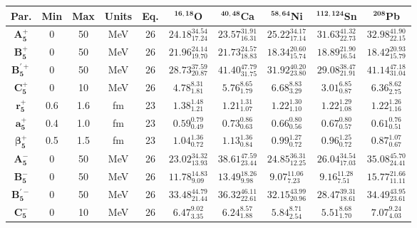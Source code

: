 \bgroup
\def\arraystretch{1.5}%
\begin{tabular}{ c c c c c c c c c c} 
\textbf{Par.} & \textbf{Min} & \textbf{Max} &                \textbf{Units} & \textbf{Eq.}& \textbf{$\mathbf{^{16,18}}$O}& \textbf{$\mathbf{^{40,48}}$Ca}& \textbf{$\mathbf{^{58,64}}$Ni}& \textbf{$\mathbf{^{112,124}}$Sn}& \textbf{$\mathbf{^{208}}$Pb}\\
 \hline 
$\mathbf{A_{5}^{+}}$ & 0 & 50 & MeV & 26 & $24.18^{34.54}_{17.24}$ & $23.57^{31.91}_{16.31}$ & $25.22^{34.17}_{17.14}$ & $31.63^{41.32}_{22.73}$ & $32.98^{41.90}_{22.15}$\\ 
$\mathbf{B_{5}^{+}}$ & 0 & 50 & MeV & 26 & $21.96^{24.14}_{19.70}$ & $21.73^{24.57}_{18.83}$ & $18.34^{20.60}_{15.74}$ & $18.89^{21.90}_{16.54}$ & $18.42^{20.93}_{15.79}$\\ 
$\mathbf{B_{5}^{'+}}$ & 0 & 50 & MeV & 26 & $28.73^{37.59}_{20.87}$ & $41.40^{47.79}_{31.75}$ & $31.92^{40.20}_{23.80}$ & $29.08^{38.47}_{21.91}$ & $41.14^{47.18}_{31.04}$\\ 
$\mathbf{C_{5}^{+}}$ & 0 & 10 & MeV & 26 & $4.78^{8.31}_{1.81}$ & $5.76^{8.65}_{1.79}$ & $6.68^{8.83}_{3.29}$ & $3.01^{6.85}_{0.87}$ & $6.36^{8.62}_{2.75}$\\ 
$\mathbf{r_{5}^{+}}$ & 0.6 & 1.6 & fm & 23 & $1.38^{1.48}_{1.21}$ & $1.21^{1.31}_{1.07}$ & $1.22^{1.30}_{1.10}$ & $1.22^{1.29}_{1.08}$ & $1.22^{1.26}_{1.16}$\\ 
$\mathbf{a_{5}^{+}}$ & 0.4 & 1.0 & fm & 23 & $0.59^{0.79}_{0.49}$ & $0.73^{0.86}_{0.63}$ & $0.66^{0.80}_{0.56}$ & $0.67^{0.80}_{0.57}$ & $0.61^{0.76}_{0.51}$\\ 
$\mathbf{\beta_{5}^{+}}$ & 0.5 & 1.5 & fm & 23 & $1.04^{1.36}_{0.72}$ & $1.13^{1.36}_{0.84}$ & $0.99^{1.27}_{0.72}$ & $0.96^{1.25}_{0.72}$ & $0.87^{1.07}_{0.67}$\\ 
$\mathbf{A_{5}^{-}}$ & 0 & 50 & MeV & 26 & $23.02^{34.32}_{13.93}$ & $38.61^{47.59}_{23.44}$ & $24.85^{36.31}_{12.25}$ & $26.04^{34.54}_{17.03}$ & $35.08^{45.70}_{24.41}$\\ 
$\mathbf{B_{5}^{-}}$ & 0 & 50 & MeV & 26 & $11.78^{14.83}_{9.09}$ & $13.49^{18.26}_{9.98}$ & $9.07^{11.06}_{7.23}$ & $9.16^{11.28}_{7.51}$ & $15.77^{21.66}_{11.11}$\\ 
$\mathbf{B_{5}^{'-}}$ & 0 & 50 & MeV & 26 & $33.48^{44.79}_{21.44}$ & $36.32^{46.11}_{22.61}$ & $32.15^{43.99}_{20.96}$ & $28.47^{39.31}_{18.61}$ & $34.49^{43.95}_{23.61}$\\ 
$\mathbf{C_{5}^{-}}$ & 0 & 10 & MeV & 26 & $6.47^{9.02}_{3.35}$ & $6.24^{8.57}_{1.88}$ & $5.84^{8.71}_{2.54}$ & $5.51^{8.68}_{1.70}$ & $7.07^{9.24}_{4.03}$\\ 

\end{tabular}

